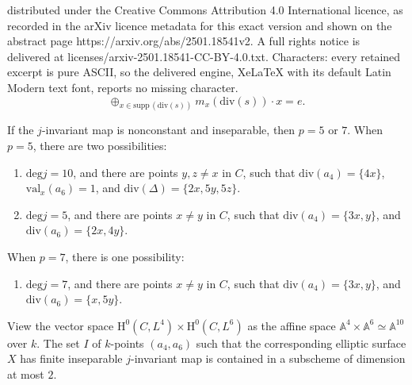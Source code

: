 \documentclass[10pt,a4paper]{amsart}
\newcommand{\IA}{\mathbb{A}}
\newcommand{\supp}{\mathrm{supp \,}}
\renewcommand{\H}{\mathrm{H}}
\renewcommand{\deg}{\mathrm{deg}}
\renewcommand{\div}{\mathrm{div}}
\begin{document}
distributed under the Creative Commons Attribution 4.0 International licence, as recorded in the arXiv licence metadata for this exact version and shown on the abstract page https://arxiv.org/abs/2501.18541v2. A full rights notice is delivered at licenses/arxiv-2501.18541-CC-BY-4.0.txt. Characters: every retained excerpt is pure ASCII, so the delivered engine, XeLaTeX with its default Latin Modern text font, reports no missing character.
\begin{equation}
    \label{eqn: sum to zero}
    \oplus_{x \in \supp(\mathrm{div}(s))} m_x(\div(s)) \cdot x = e.
\end{equation}

\begin{proposition}
\label{prop: inspearable j}
    If the $j$-invariant map is nonconstant and inseparable, then $p = 5$ or $7$. When $p = 5$, there are two possibilities: 
    \begin{enumerate}[label=\upshape{(\roman*)}]
        \item $\deg j = 10$, and there are points $y, z \neq x$ in $C$, such that $\mathrm{div}(a_4) = \{4x \}$, $\mathrm{val}_x(a_6) = 1$, and $\mathrm{div}(\Delta) = \{2x, 5y,  5z\}$. 
        \item $\deg j = 5$, and there are points $x \neq y$ in $C$, such that $\div(a_4) = \{ 3x, y \}$, and $\div(a_6) = \{ 2x, 4y \}$.  
    \end{enumerate}
    When $p = 7$, there is one possibility: 
    \begin{enumerate}
        \item[\upshape{(iii)}] $\deg j = 7$, and there are points $x \neq y$ in $C$, such that $\div(a_4) = \{ 3x, y \}$, and $\div(a_6) = \{ x, 5y \}$. 
    \end{enumerate}
\end{proposition}

\begin{corollary}
\label{cor: bound inseparable}
    View the vector space $\H^0(C, L^4) \times \H^0(C, L^6)$ as the affine space $\IA^4 \times \IA^6 \simeq \IA^{10}$ over $k$. The set $I$ of $k$-points $(a_4, a_6)$ such that the corresponding elliptic surface $X$ has finite inseparable $j$-invariant map is contained in a subscheme of dimension at most $2$. 
\end{corollary}
\end{document}

